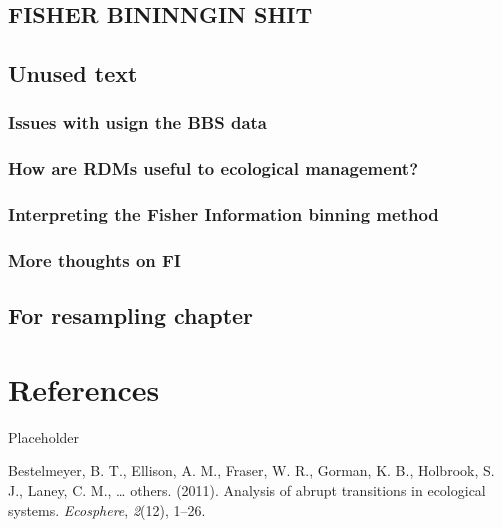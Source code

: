 \documentclass[12pt,twoside,openany]{reedthesis}
\begin{document}
\section{FISHER BININNGIN SHIT}\label{fisher-bininngin-shit}

\section{Unused text}\label{unused-text}

\subsection{Issues with usign the BBS
data}\label{issues-with-usign-the-bbs-data}

\subsection{How are RDMs useful to ecological
management?}\label{how-are-rdms-useful-to-ecological-management}

\subsection{Interpreting the Fisher Information binning
method}\label{interpreting-the-fisher-information-binning-method}

\subsection{More thoughts on FI}\label{more-thoughts-on-fi}

\section{For resampling chapter}\label{for-resampling-chapter}

\chapter*{References}\label{references}

Placeholder

\hypertarget{refs}{}
\hypertarget{ref-bestelmeyer_analysis_2011}{}
Bestelmeyer, B. T., Ellison, A. M., Fraser, W. R., Gorman, K. B.,
Holbrook, S. J., Laney, C. M., \ldots{} others. (2011). Analysis of
abrupt transitions in ecological systems. \emph{Ecosphere},
\emph{2}(12), 1--26.
\end{document}
